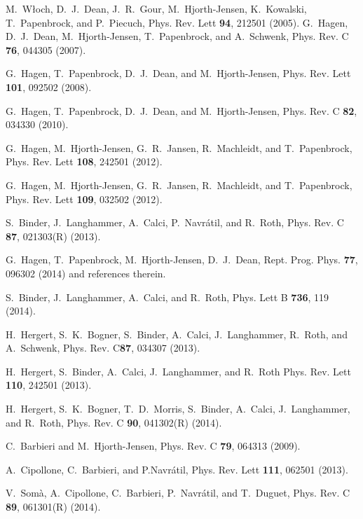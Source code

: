 \documentclass[aps,prc, dvips, twocolumn,groupedaddress,showkeys,showpacs,floatfix,superscriptaddress]{revtex4-1}
\newcommand{\<}{\langle}
\renewcommand{\>}{\rangle}
\begin{document}
\begin{thebibliography}{99}
	M.~W\l{}och, D.~J.~Dean, J.~R.~Gour, M.~Hjorth-Jensen,
  K.~Kowalski, T.~Papenbrock, and P.~Piecuch, Phys. Rev. Lett {\bf 94}, 212501 (2005).
  G.~Hagen, D.~J.~Dean, M.~Hjorth-Jensen,
   T.~Papenbrock, and A.~Schwenk, Phys. Rev. C {\bf 76}, 044305 (2007).

	G.~Hagen, T.~Papenbrock, D.~J.~Dean, and M.~Hjorth-Jensen,
  Phys. Rev. Lett {\bf 101}, 092502 (2008).

  G.~Hagen, T.~Papenbrock, D.~J.~Dean, and
	 M.~Hjorth-Jensen,
   Phys. Rev. C {\bf 82}, 034330 (2010).

	G.~Hagen, M.~Hjorth-Jensen, G.~R.~Jansen, R.~Machleidt, and
  T.~Papenbrock, Phys. Rev. Lett {\bf 108}, 242501 (2012).

	G.~Hagen, M.~Hjorth-Jensen, G.~R.~Jansen, R.~Machleidt, and
  T.~Papenbrock, Phys. Rev. Lett {\bf 109}, 032502 (2012).

	S.~Binder, J.~Langhammer, A.~Calci, P.~Navr\'atil, and R.~Roth,
  Phys. Rev. C {\bf 87}, 021303(R) (2013).

        G.~Hagen, T.~Papenbrock, M.~Hjorth-Jensen, D.~J.~Dean,
        Rept. Prog. Phys. {\bf 77}, 096302 (2014) and references therein.

	S.~Binder, J.~Langhammer, A.~Calci, and R.~Roth,
  Phys. Lett B {\bf 736}, 119 (2014).

	H.~Hergert, S.~K.~Bogner, S.~Binder, A.~Calci, J.~Langhammer,
	R.~Roth, and A.~Schwenk,
  Phys. Rev. C{\bf 87}, 034307 (2013).

	H.~Hergert, S.~Binder, A.~Calci, J.~Langhammer, and R.~Roth
  Phys. Rev. Lett {\bf 110}, 242501 (2013).

	H.~Hergert, S.~K.~Bogner, T.~D.~Morris, S.~Binder, A.~Calci,
	J.~Langhammer, and R.~Roth,
  Phys. Rev. C {\bf 90}, 041302(R) (2014).

	C.~Barbieri and M.~Hjorth-Jensen,
  Phys. Rev. C {\bf 79}, 064313 (2009).

	A.~Cipollone, C.~Barbieri, and P.Navr\'atil,
  Phys. Rev. Lett {\bf 111}, 062501 (2013).

	V.~Som\`a, A.~Cipollone, C.~Barbieri, P.~Navr\'atil, and
	T.~Duguet,
  Phys. Rev. C {\bf 89}, 061301(R) (2014).


\end{thebibliography}
\end{document}

